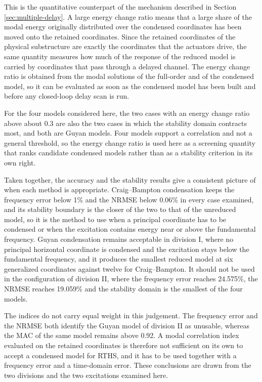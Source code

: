 \documentclass[11pt,a4paper]{article}
\numberwithin{equation}{section}
\begin{document}
This is the quantitative counterpart of the mechanism described in Section \ref{sec:multiple-delay}. A large energy change ratio means that a large share of the modal energy originally distributed over the condensed coordinates has been moved onto the retained coordinates. Since the retained coordinates of the physical substructure are exactly the coordinates that the actuators drive, the same quantity measures how much of the response of the reduced model is carried by coordinates that pass through a delayed channel. The energy change ratio is obtained from the modal solutions of the full-order and of the condensed model, so it can be evaluated as soon as the condensed model has been built and before any closed-loop delay scan is run.

For the four models considered here, the two cases with an energy change ratio above about 0.3 are also the two cases in which the stability domain contracts most, and both are Guyan models. Four models support a correlation and not a general threshold, so the energy change ratio is used here as a screening quantity that ranks candidate condensed models rather than as a stability criterion in its own right.

Taken together, the accuracy and the stability results give a consistent picture of when each method is appropriate. Craig--Bampton condensation keeps the frequency error below 1\% and the NRMSE below 0.06\% in every case examined, and its stability boundary is the closer of the two to that of the unreduced model, so it is the method to use when a principal coordinate has to be condensed or when the excitation contains energy near or above the fundamental frequency. Guyan condensation remains acceptable in division I, where no principal horizontal coordinate is condensed and the excitation stays below the fundamental frequency, and it produces the smallest reduced model at six generalized coordinates against twelve for Craig--Bampton. It should not be used in the configuration of division II, where the frequency error reaches 24.575\%, the NRMSE reaches 19.059\% and the stability domain is the smallest of the four models.

The indices do not carry equal weight in this judgement. The frequency error and the NRMSE both identify the Guyan model of division II as unusable, whereas the MAC of the same model remains above 0.92. A modal correlation index evaluated on the retained coordinates is therefore not sufficient on its own to accept a condensed model for RTHS, and it has to be used together with a frequency error and a time-domain error. These conclusions are drawn from the two divisions and the two excitations examined here.
\end{document}
